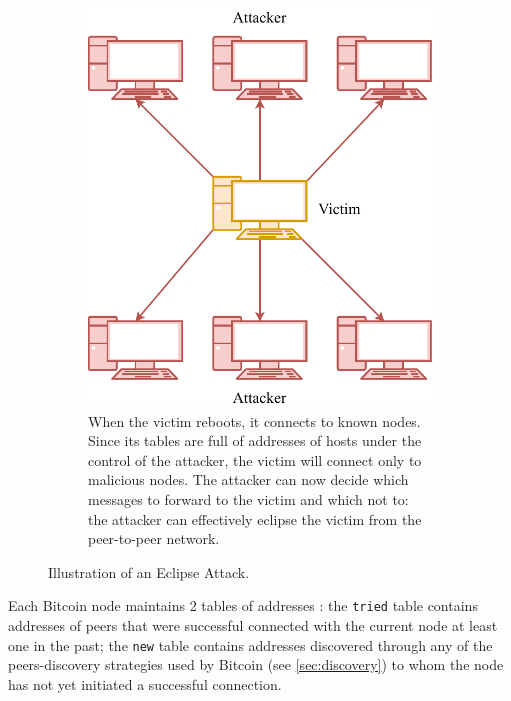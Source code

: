 \begin{figure}[h!]
\begin{subfigure}{.45\textwidth}
{		}
	\end{subfigure}
	\hfill
	\begin{subfigure}{.45\textwidth}
		\vspace*{0.25cm}
		\includegraphics[width=\columnwidth]{figures/eclipse_2}
		\vspace*{0.1cm}
		\caption{
			When the victim reboots, it connects to known nodes.
			Since its tables are full of addresses of hosts under the control of the attacker, the victim will connect only to malicious nodes.
			The attacker can now decide which messages to forward to the victim and which not to:
			the attacker can effectively eclipse the victim from the peer-to-peer network.
		}
	\end{subfigure}
	\caption[Illustration of an Eclipse Attack]{Illustration of an Eclipse Attack.}
	\label{fig:eclipse}
\end{figure}

\bigskip
Each Bitcoin node maintains \num{2} tables of addresses \cite{eclipse_attack_2015}:
the \texttt{tried} table contains addresses of peers that were successful connected with the current node at least one in the past;
the \texttt{new} table contains addresses discovered through any of the peers-discovery strategies used by Bitcoin (see \cref{sec:discovery}) to whom the node has not yet initiated a successful connection.


